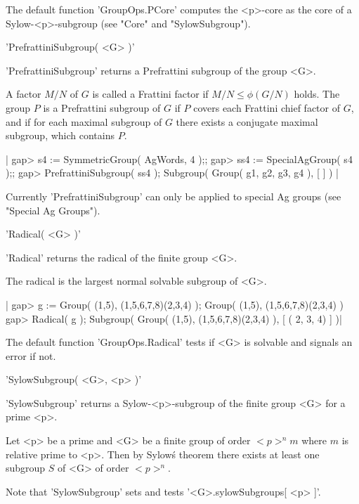 The default function 'GroupOps.PCore' computes  the <p>-core as  the core
of a Sylow-<p>-subgroup (see "Core" and "SylowSubgroup").


'PrefrattiniSubgroup( <G> )' 

'PrefrattiniSubgroup' returns a Prefrattini subgroup of the group <G>.

A factor $M/N$ of $G$ is called a Frattini factor if $M/N \leq \phi(G/N)$
holds.  The group $P$ is a Prefrattini subgroup of $G$ if $P$ covers each
Frattini chief factor  of $G$, and  if for each  maximal subgroup  of $G$
there exists a conjugate maximal subgroup, which contains $P$.

|    gap> s4 := SymmetricGroup( AgWords, 4 );;
    gap> ss4 := SpecialAgGroup( s4 );;
    gap> PrefrattiniSubgroup( ss4 );
    Subgroup( Group( g1, g2, g3, g4 ), [  ] ) |

Currently 'PrefrattiniSubgroup' can only be applied to special Ag groups
(see "Special Ag Groups").


'Radical( <G> )'

'Radical' returns the radical of the finite group <G>.

The radical is the largest normal solvable subgroup of <G>.

|    gap> g := Group( (1,5), (1,5,6,7,8)(2,3,4) );
    Group( (1,5), (1,5,6,7,8)(2,3,4) )
    gap> Radical( g );
    Subgroup( Group( (1,5), (1,5,6,7,8)(2,3,4) ), [ ( 2, 3, 4) ] )|

The default function  'GroupOps.Radical'  tests if  <G>  is  solvable and
signals an error if not.


'SylowSubgroup( <G>, <p> )'

'SylowSubgroup' returns a Sylow-<p>-subgroup of the finite group  <G> for
a prime <p>.

Let <p> be a prime and <G> be a finite group of order $<p>^n m$ where $m$
is relative prime to <p>. Then by Sylow\'s theorem there  exists at least
one subgroup $S$ of <G> of order $<p>^n$.

Note that 'SylowSubgroup' sets and tests '<G>.sylowSubgroups[ <p> ]'.

